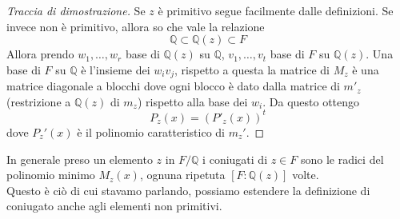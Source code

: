 \begin{proof}[Traccia di dimostrazione]
	Se $z$ è primitivo segue facilmente dalle definizioni. Se invece non è primitivo, allora so che vale la relazione 
	\begin{equation*}
	\mathbb{Q}\subset \mathbb{Q}(z)\subset F
	\end{equation*}
	Allora prendo $w_1,\dots,w_r$ base di $\mathbb{Q}(z)$ su $\mathbb{Q}$, $v_1,\dots,v_t$ base di $F$ su $\mathbb{Q}(z)$. Una base di $F$ su $\mathbb{Q}$ è l'insieme dei $w_iv_j$, rispetto a questa la matrice di $M_z$ è una matrice diagonale a blocchi dove ogni blocco è dato dalla matrice di $m'_z$ (restrizione a $\mathbb{Q}(z)$ di $m_z$) rispetto alla base dei $w_i$. Da questo ottengo 
	\begin{equation*}
	P_z(x)=\left(P'_z(x)\right)^t
	\end{equation*}
	dove $P_z'(x)$ è il polinomio caratteristico di $m_z'$.
\end{proof}
\begin{osservazione}
	In generale preso un elemento $z$ in $F/\mathbb{Q}$ i coniugati di $z\in F$ sono le radici del polinomio minimo $M_z(x)$, ognuna ripetuta $[F:\mathbb{Q}(z)]$ volte. \\ Questo è ciò di cui stavamo parlando, possiamo estendere la definizione di coniugato anche agli elementi non primitivi.
\end{osservazione}






